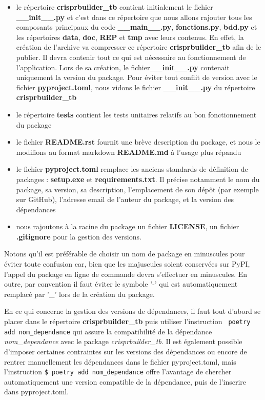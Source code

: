 \documentclass[twoside,a4paper,11pt,frenchb,openany]{report}
\begin{document}
\begin{itemize}
\item le répertoire \textbf{crisprbuilder\_tb} contient initialement le fichier \textbf{\_\_init\_\_.py} et c'est dans ce répertoire que nous allons rajouter tous les composants principaux du code  \textbf{\_\_main\_\_.py}, \textbf{fonctions.py}, \textbf{bdd.py} et les répertoires \textbf{data}, \textbf{doc}, \textbf{REP} et \textbf{tmp} avec leurs contenus. En effet, la création de l'archive va compresser ce répertoire \textbf{crisprbuilder\_tb} afin de le publier. Il devra contenir tout ce qui est nécessaire au fonctionnement de l'application. Lors de sa création, le fichier\textbf{\_\_init\_\_.py} contenait uniquement la version du package. Pour éviter tout conflit de version avec le fichier \textbf{pyproject.toml}, nous vidons le fichier \textbf{\_\_init\_\_.py} du répertoire \textbf{crisprbuilder\_tb}
\item le répertoire \textbf{tests} contient les tests unitaires relatifs au bon fonctionnement du package
\item le fichier \textbf{README.rst} fournit une brève description du package, et nous le modifions au format markdown \textbf{README.md} à l'usage plus répandu
\item le fichier \textbf{pyproject.toml} remplace les anciens standards de définition de packages : \textbf{setup.exe} et \textbf{requirements.txt}. Il précise notamment le nom du package, sa version, sa description, l’emplacement de son dépôt (par exemple sur GitHub), l’adresse email de l’auteur du package, et la version des dépendances
\item nous rajoutons à la racine du package un fichier \textbf{LICENSE}, un fichier \textbf{.gitignore} pour la gestion des versions. 
\end{itemize}

Notons qu'il est préférable de choisir un nom de package en minuscules pour éviter toute confusion car, bien que les majuscules soient conservées sur PyPI, l'appel du package en ligne de commande devra s'effectuer en minuscules. En outre, par convention il faut éviter le symbole '-' qui est automatiquement remplacé par '\_' lors de la création du package.

En ce qui concerne la gestion des versions de dépendances, il faut tout d'abord se placer dans le répertoire \textbf{crisprbuilder\_tb} puis utiliser l’instruction
\texttt{  poetry add nom\_dependance}  
qui assure la compatibilité de la dépendance \textit{nom\_dependance} avec le package \textit{crisprbuilder\_tb}. Il est également possible d’imposer certaines contraintes sur les versions des dépendances ou encore de rentrer manuellement les dépendances dans le fichier pyproject.toml, mais l’instruction 
\texttt{\$ poetry add nom\_dependance} 
offre l’avantage de chercher automatiquement une version compatible de la dépendance, puis de l’inscrire dans pyproject.toml.
\end{document}
